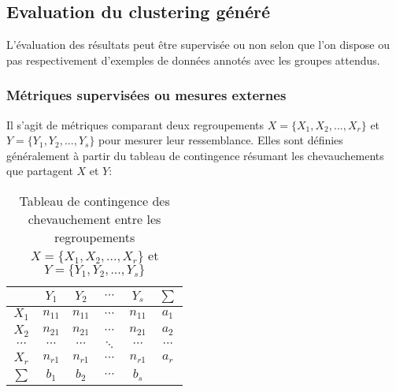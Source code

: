 





\subsection{Evaluation du clustering généré}
L'évaluation des résultats peut être supervisée ou non selon que l'on dispose ou pas respectivement d'exemples de données annotés avec les groupes attendus.

\subsubsection{Métriques supervisées ou mesures externes}
\label{sec:similarite:biblio:supeval}
Il s'agit de métriques comparant deux regroupements $X = \lbrace X_1, X_2, ..., X_r \rbrace$ et $Y = \lbrace Y_1, Y_2, ..., Y_s \rbrace$ pour mesurer leur ressemblance. Elles sont définies généralement à partir du tableau de contingence résumant les chevauchements que partagent $X$ et $Y$:
\begin{table}[]
	\centering
	\begin{tabular}{|c|c|c|c|c|c|}
		\hline
		& $Y_1$    & $Y_2$    & $\cdots$ & $Y_s$    & $\sum$   \\ \hline
		$X_1$    & $n_{11}$ & $n_{11}$ & $\cdots$ & $n_{11}$ & $a_1$    \\ \hline
		$X_2$    & $n_{21}$ & $n_{21}$ & $\cdots$ & $n_{21}$ & $a_2$    \\ \hline
		$\cdots$ & $\cdots$ & $\cdots$ & $\ddots$ & $\cdots$ & $\cdots$ \\ \hline
		$X_r$    & $n_{r1}$ & $n_{r1}$ & $\cdots$ & $n_{r1}$ & $a_r$    \\ \hline
		$\sum$   & $b_1$    & $b_2$    & $\cdots$ & $b_s$    &          \\ \hline
	\end{tabular}
	\caption{Tableau de contingence des chevauchement entre les regroupements $X = \lbrace X_1, X_2, ..., X_r \rbrace$ et $Y = \lbrace Y_1, Y_2, ..., Y_s \rbrace$}
\end{table}

